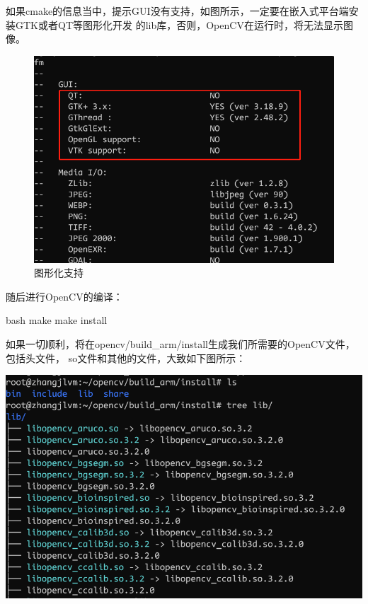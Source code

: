 \begin{outline}[enumerate]
如果cmake的信息当中，提示GUI没有支持，如图所示，一定要在嵌入式平台端安装GTK或者QT等图形化开发
的lib库，否则，OpenCV在运行时，将无法显示图像。
\begin{figure}[H]
  \centering
  \includegraphics[scale=0.3]{cross_gui.png}
  \caption{图形化支持}
  \label{fig:cross_gui}
\end{figure}

随后进行OpenCV的编译：
\begin{code-in-enumerate}{bash}
make
make install
\end{code-in-enumerate}
如果一切顺利，将在opencv/build\_arm/install生成我们所需要的OpenCV文件，包括头文件，
so文件和其他的文件，大致如下图所示：
\par\begin{minipage}{\linewidth}
  \centering
  \includegraphics[width=\linewidth]{cross_finish.png}
  \label{fig:cross_finish}
\end{minipage}


\end{outline}
